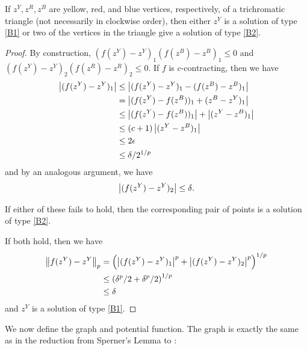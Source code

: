   \begin{lemma} \label{lemma:TrichromaticTriangles}
    If $z^Y,z^R,z^B$ are yellow, red, and blue vertices, respectively, of a trichromatic triangle (not necessarily in clockwise order), then either $z^Y$ is a solution of type \ref{B1} or two of the vertices in the triangle give a solution of type \ref{B2}.
  \end{lemma}
  \begin{proof}
    By construction, $(f(z^Y) - z^Y)_1 (f(z^B) - z^B)_1 \leq 0$ and $(f(z^Y) - z^Y)_2 (f(z^R) - z^R)_2 \leq 0$.
    If $f$ is $c$-contracting, then we have 
    \begin{align*}
      \left| (f(z^Y) - z^Y)_1 \right| &\leq \left| (f(z^Y) - z^Y)_1 - (f(z^B) - z^B)_1 \right|\\
                             &= \left| (f(z^Y) - f(z^B))_1 + (z^B - z^Y)_1 \right|\\
                             &\leq \left| (f(z^Y) - f(z^B))_1 \right| + \left| (z^Y - z^B)_1 \right|\\
                             &\leq (c+1)\left| (z^Y - z^B)_1 \right|\\
                             &\leq 2\epsilon\\
                             &\leq \delta/2^{1/p}
    \end{align*}  and by an analogous argument, we have
    \[ \left| (f(z^Y) - z^Y)_2 \right| \leq \delta\text{.} \]

    If either of these fails to hold, then the corresponding pair of points is a solution of type \ref{B2}.

    If both hold, then we have
    \begin{align*}
      \left\| f(z^Y) - z^Y \right\|_p &= \left( \left| (f(z^Y) - z^Y)_1 \right|^p + \left| (f(z^Y) - z^Y)_2 \right|^p \right)^{1/p} \\
                          &\leq \left( \delta^p/2 + \delta^p/2 \right)^{1/p}\\
                          &\leq \delta
    \end{align*} and $z^Y$ is a solution of type \ref{B1}.
  \end{proof}
  We now define the \EOPL graph and potential function. The graph is exactly the same as in the reduction from Sperner's Lemma to \EOL:

